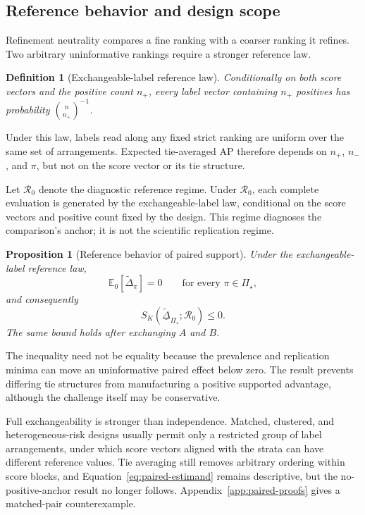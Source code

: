 \documentclass[11pt]{article}
\newcommand{\Regime}{\mathcal{R}}
\newcommand{\PSet}{\Pi_\star}
\newcommand{\E}{\mathbb{E}}
\newcommand{\Dta}{\widetilde{\Delta}}
\newcommand{\RobDta}{\underline{\widetilde{\Delta}}_{\PSet}}
\newtheorem{definition}{Definition}
\newtheorem{proposition}{Proposition}
\theoremstyle{remark}
\begin{document}
\subsection{Reference behavior and design scope}
\label{sec:paired-scope}

Refinement neutrality compares a fine ranking with a coarser ranking it refines. Two arbitrary uninformative rankings require a stronger reference law.

\begin{definition}[Exchangeable-label reference law]
\label{def:exchangeable}
Conditionally on both score vectors and the positive count $n_+$, every label vector containing $n_+$ positives has probability $\binom{n}{n_+}^{-1}$.
\end{definition}

Under this law, labels read along any fixed strict ranking are uniform over the same set of arrangements. Expected tie-averaged AP therefore depends on $n_+$, $n_-$, and $\pi$, but not on the score vector or its tie structure.

Let $\Regime_0$ denote the diagnostic reference regime. Under $\Regime_0$, each complete evaluation is generated by the exchangeable-label law, conditional on the score vectors and positive count fixed by the design. This regime diagnoses the comparison's anchor; it is not the scientific replication regime.

\begin{proposition}[Reference behavior of paired support]
\label{prop:paired-reference}
Under the exchangeable-label reference law,
\[
\E_0[\Dta_\pi]=0
\qquad\text{for every }\pi\in\PSet,
\]
and consequently
\[
S_K(\RobDta;\Regime_0)\leq0.
\]
The same bound holds after exchanging $A$ and $B$.
\end{proposition}

The inequality need not be equality because the prevalence and replication minima can move an uninformative paired effect below zero. The result prevents differing tie structures from manufacturing a positive supported advantage, although the challenge itself may be conservative.

Full exchangeability is stronger than independence. Matched, clustered, and heterogeneous-risk designs usually permit only a restricted group of label arrangements, under which score vectors aligned with the strata can have different reference values. Tie averaging still removes arbitrary ordering within score blocks, and Equation~\eqref{eq:paired-estimand} remains descriptive, but the no-positive-anchor result no longer follows. Appendix~\ref{app:paired-proofs} gives a matched-pair counterexample.
\end{document}
